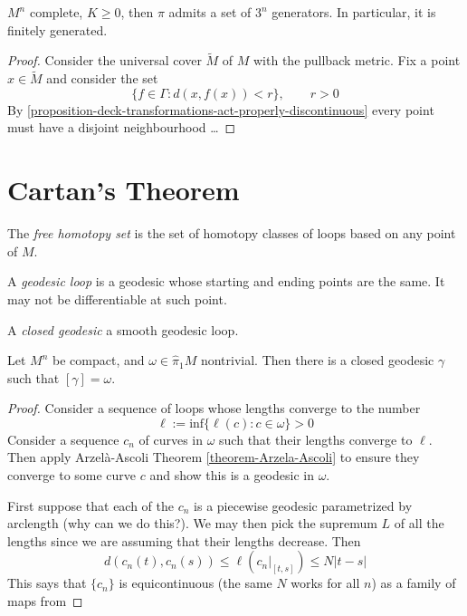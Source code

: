 \begin{theorem}[Gromov]
\label{theorem-Gromov}
$M^n$ complete, $K \geq 0$, then $\pi$ admits a set of $3^n$ generators. In
particular, it is finitely generated.
\end{theorem}

\begin{proof}
Consider the universal cover $\tilde{M}$ of $M$ with the pullback metric. Fix a
point $x \in \tilde{M}$ and consider the set
$$
\{f \in \Gamma:d(x,f(x))<r\},\qquad r>0
$$
By \ref{proposition-deck-transformations-act-properly-discontinuous}
every point must have a disjoint neighbourhood … 
\end{proof}

\section{Cartan's Theorem}
\label{section-Cartan-theorem}

\begin{definition}
\label{definition-free-homotopy-set}
The {\it free homotopy set} is the set of homotopy classes of loops based on any
point of $M$.
\end{definition}

\begin{definition}
\label{definition-geodesic-loop}
A {\it geodesic loop} is a geodesic whose starting and ending points are the
same. It may not be differentiable at such point.
\end{definition}

\begin{definition}
\label{definition-closed-geodesic}
A {\it closed geodesic} a smooth geodesic loop.
\end{definition}

\begin{theorem}[Cartan]
\label{theorem-Cartan}
Let $M^n$ be compact, and $\omega \in \hat{\pi}_1M$ nontrivial. Then there is a
closed geodesic $\gamma$ such that $[\gamma]=\omega$.
\end{theorem}

\begin{proof}
Consider a sequence of loops whose lengths converge to the number
$$
\ell:=\text{inf}\{\ell(c):c \in \omega\}>0
$$
Consider a sequence $c_n$ of curves in $\omega$ such that their lengths converge
to $\ell$. Then apply Arzelà-Ascoli Theorem \ref{theorem-Arzela-Ascoli}
 to ensure they converge to some curve $c$ and show this is a geodesic 
in $\omega$.

First suppose that each of the $c_n$ is a piecewise geodesic parametrized by
arclength (why can we do this?). We may then pick the supremum $L$ of all the
lengths since we are assuming that their lengths decrease. Then
$$
d(c_n(t),c_n(s)) \leq \ell \left(c_n|_{[t,s]}\right) \leq  N |t-s|
$$
This says that $\{c_n\}$ is equicontinuous (the same $N$ works for all $n$) as a
family of maps from 
\end{proof}

